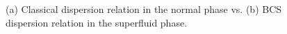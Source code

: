 \begin{figure}[b]
	\centering
	\caption[Dispersion relations]{(a) Classical dispersion relation in the normal phase vs. (b) BCS dispersion relation in the superfluid phase.}
	\label{fig:dispersion-relation}
\end{figure}